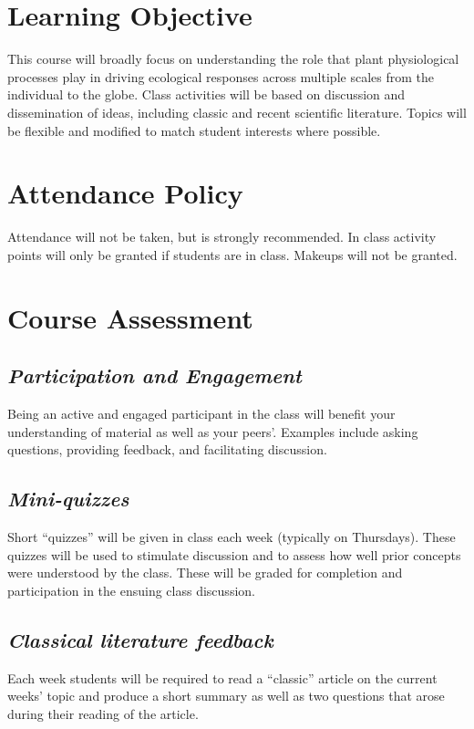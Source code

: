 \documentclass[12pt, notitlepage]{article}   	%
\begin{document}
\section{Learning Objective}
This course will broadly focus on understanding the role that plant physiological 
processes play in driving ecological responses across multiple scales from the individual 
to the globe. Class activities will be based on discussion and dissemination of ideas, 
including classic and recent scientific literature. 
Topics will be flexible and modified to match student interests where possible.

\section{Attendance Policy}
Attendance will not be taken, but is strongly recommended. 
In class activity points will only be granted if students are in class.
Makeups will not be granted.

\section{Course Assessment}
\subsection{\textit{Participation and Engagement}}
Being an active and engaged participant in the class will benefit your understanding
of material as well as your peers'. Examples include asking questions, providing feedback,
and facilitating discussion.

\subsection{\textit{Mini-quizzes}}
Short “quizzes” will be given in class each week (typically on Thursdays). 
These quizzes will be used to stimulate discussion and to assess how well 
prior concepts were understood by the class. 
These will be graded for completion and participation in the ensuing class discussion.

\subsection{\textit{Classical literature feedback}}
Each week students will be required to read a “classic” article on the current weeks’ 
topic and produce a short summary as well as two questions that arose during their 
reading of the article. 
\end{document}
